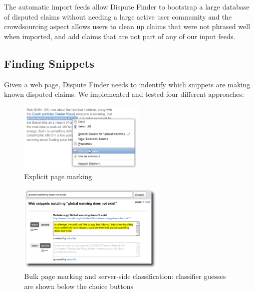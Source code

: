 \documentclass{www2010-submission}
\newcommand{\todo}[1]{}
\begin{document}
The automatic import feeds allow Dispute Finder to bootstrap a large database of disputed claims without needing a large active user community and the crowdsourcing aspect allows users to clean up claims that were not phrased well when imported, and add claims that are not part of any of our input feeds.

\todo{Say how many disputed claims}

\todo{talk about duplicates}

\todo{Actually import the Politifact data}

\subsection{Finding Snippets}

Given a web page, Dispute Finder needs to indentify which snippets are making known disputed claims. We implemented and tested four different approaches:

\begin{figure}[tb]
	\begin{center}
	\includegraphics[width=6cm]{pictures/mark_disputed.png}
	\caption{Explicit page marking}
	\label{mark_disputed}
	\end{center}
\end{figure}

\begin{figure}[tb]
	\begin{center}
	\includegraphics[width=7cm]{pictures/training2.png}
	\caption{Bulk page marking and server-side classification: classifier guesses are shown below the choice buttons}
	\label{training}
	\end{center}
\end{figure}
\end{document}
